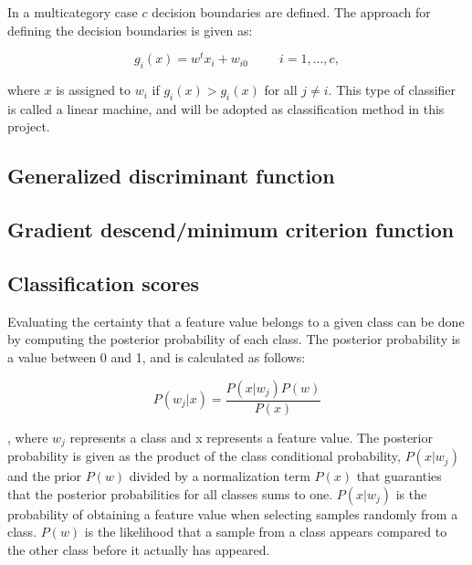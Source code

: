 In a multicategory case $c$ decision boundaries are defined. The approach for defining the decision boundaries is given as:

\begin{equation}
	g_{i}(x) = w^tx_i +w_{i0} ~~~~~~~~~~~ i = 1,...,c,
\end{equation}

where $x$ is assigned to $w_i$ if $g_i(x) > g_i(x)$ for all $j \neq i$. This type of classifier is called a linear machine, and will be adopted as classification method in this project. 


\subsection{Generalized discriminant function}


\subsection{Gradient descend/minimum criterion function}


\subsection{Classification scores}
Evaluating the certainty that a feature value belongs to a given class can be done by computing the posterior probability of each class. The posterior probability is a value between 0 and 1, and is calculated as follows:

\begin{equation}
P(w_j|x) = \frac{P(x|w_j)P(w)}{P(x)}
\end{equation}

, where $w_j$ represents a class and x represents a feature value. The posterior probability is given as the product of the class conditional probability, $P(x|w_j)$ and the prior $P(w)$ divided by a normalization term $P(x)$ that guaranties that the posterior probabilities for all classes sums to one. $P(x|w_j)$ is the probability of obtaining a feature value when selecting samples randomly from a class. $P(w)$ is the likelihood that a sample from a class appears compared to the other class before it actually has appeared. 
